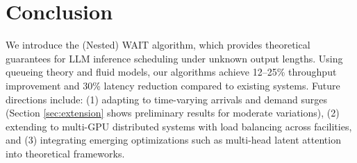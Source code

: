 \section{Conclusion}

We introduce the (Nested) WAIT algorithm, which provides theoretical guarantees for LLM inference scheduling under unknown output lengths. Using queueing theory and fluid models, our algorithms achieve 12--25\% throughput improvement and 30\% latency reduction compared to existing systems. Future directions include: (1) adapting to time-varying arrivals and demand surges (Section \ref{sec:extension} shows preliminary results for moderate variations), (2) extending to multi-GPU distributed systems with load balancing across facilities, and (3) integrating emerging optimizations such as multi-head latent attention \citep{deepseekai2024deepseekv2strongeconomicalefficient} into theoretical frameworks.
